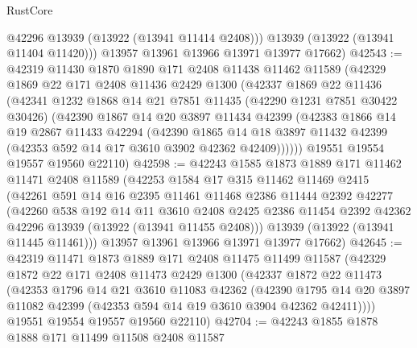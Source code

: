 \begin{lexlean}{RustCore}
\begin{coremodule}
          @42296
          @13939
          (@13922 (@13941 @11414 @2408)))
        @13939
        (@13922 (@13941 @11404 @11420)))
      @13957
      @13961
      @13966
      @13971
      @13977
      @17662)
@42543 := @42319
    @11430
    @1870
    @1890
    @171
    @2408
    @11438
    @11462
    @11589
    (@42329
      @1869
      @22
      @171
      @2408
      @11436
      @2429
      @1300
      (@42337
        @1869
        @22
        @11436
        (@42341
          @1232
          @1868
          @14
          @21
          @7851
          @11435
          (@42290 @1231 @7851 @30422 @30426)
          (@42390
            @1867
            @14
            @20
            @3897
            @11434
            @42399
            (@42383
              @1866
              @14
              @19
              @2867
              @11433
              @42294
              (@42390
                @1865
                @14
                @18
                @3897
                @11432
                @42399
                (@42353 @592 @14 @17 @3610 @3902 @42362 @42409))))))
      @19551
      @19554
      @19557
      @19560
      @22110)
@42598 := @42243
    @1585
    @1873
    @1889
    @171
    @11462
    @11471
    @2408
    @11589
    (@42253
      @1584
      @17
      @315
      @11462
      @11469
      @2415
      (@42261
        @591
        @14
        @16
        @2395
        @11461
        @11468
        @2386
        @11444
        @2392
        @42277
        (@42260
          @538
          @192
          @14
          @11
          @3610
          @2408
          @2425
          @2386
          @11454
          @2392
          @42362
          @42296
          @13939
          (@13922 (@13941 @11455 @2408)))
        @13939
        (@13922 (@13941 @11445 @11461)))
      @13957
      @13961
      @13966
      @13971
      @13977
      @17662)
@42645 := @42319
    @11471
    @1873
    @1889
    @171
    @2408
    @11475
    @11499
    @11587
    (@42329
      @1872
      @22
      @171
      @2408
      @11473
      @2429
      @1300
      (@42337
        @1872
        @22
        @11473
        (@42353
          @1796
          @14
          @21
          @3610
          @11083
          @42362
          (@42390
            @1795
            @14
            @20
            @3897
            @11082
            @42399
            (@42353 @594 @14 @19 @3610 @3904 @42362 @42411))))
      @19551
      @19554
      @19557
      @19560
      @22110)
@42704 := @42243
    @1855
    @1878
    @1888
    @171
    @11499
    @11508
    @2408
    @11587

\end{coremodule}
\end{lexlean}
